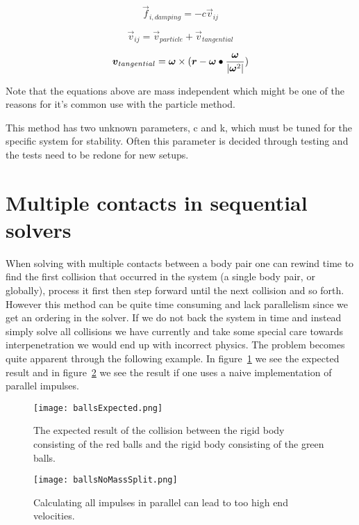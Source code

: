 \begin{equation}
  \vec{f}_{i,damping} = -c\vec{v}_{ij}
\end{equation}

\begin{equation}
  \vec{v}_{ij} = \vec{v}_{particle} + \vec{v}_{tangential}
\end{equation}

\begin{equation}\label{eq:tangent}
  \boldsymbol{v}_{tangential} = \boldsymbol{\omega} \times ( \boldsymbol{r}- \boldsymbol{\omega}\bullet\frac{\boldsymbol{\omega}}{|\boldsymbol{\omega}^2|})
\end{equation}

Note that the equations above are mass independent which might be one of the
reasons for it's common use with the particle method.

This method has two unknown parameters, c and k, which must be tuned for the
specific system for stability. Often this parameter is decided through testing
and the tests need to be redone for new setups.

\section{Multiple contacts in sequential solvers}
When solving with multiple contacts between a body pair one can rewind time to
find the first collision
that occurred in the system (a single body pair, or globally), process it first
then step forward until the next collision and so forth. However this method can
be quite time consuming and lack parallelism since we get an ordering in the solver.
If we do not back the system in time and
instead simply solve all collisions we have currently and take some special care
towards interpenetration we would end up with incorrect physics. The problem
becomes quite apparent through the following example.
In figure~\ref{fig:ballsExpected} we see the expected result and in
figure~\ref{fig:noSplit} we see the result if one uses a naive implementation of
parallel impulses.

\begin{figure}[H]
  \centering
  \texttt{[image: ballsExpected.png]}
  \caption{The expected result of the collision between the rigid body consisting
  of the red balls and the rigid body consisting of the green balls.}
  \label{fig:ballsExpected}
\end{figure}

\begin{figure}[H]
  \centering
  \texttt{[image: ballsNoMassSplit.png]}
  \caption{Calculating all impulses in parallel can lead to too high end velocities.}
  \label{fig:noSplit}
\end{figure}

